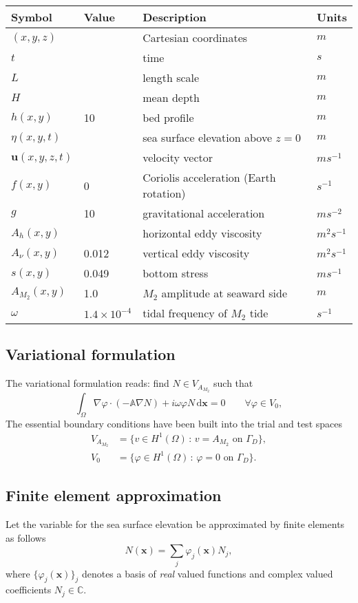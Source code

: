\documentclass[11pt,a4paper]{article}
\begin{document}
\begin{center}
\begin{tabular}{|l|l|l|l|}
\hline
Symbol & Value & Description & Units\\
\hline
$(x,y,z)$ & & Cartesian coordinates & $m$\\
$t$ & & time & $s$\\
$L$ & & length scale & $m$\\
$H$ & & mean depth & $m$\\
$h(x,y)$ & 10 & bed profile & $m$\\
$\eta(x,y,t)$ & & sea surface elevation above $z=0$ & $m$\\
$\mathbf{u}(x,y,z,t)$ & & velocity vector & $m s^{-1}$\\
$f(x,y)$ & 0 & Coriolis acceleration (Earth rotation) & $s^{-1}$\\
$g$ & 10 & gravitational acceleration & $ms^{-2}$\\
$A_h(x,y)$ & & horizontal eddy viscosity & $m^2 s^{-1}$\\
$A_\nu(x,y)$ & 0.012 & vertical eddy viscosity & $m^2 s^{-1}$\\
$s(x,y)$ & 0.049 & bottom stress & $m s^{-1}$\\
$A_{M_2}(x,y)$ & 1.0 & $M_2$ amplitude at seaward side & $m$\\
$\omega$ & $1.4\times 10^{-4}$ &tidal frequency of $M_2$ tide & $s^{-1}$\\
\hline
\end{tabular}
\end{center}

\subsection{Variational formulation}
The variational formulation reads: find $N\in V_{A_{M_2}}$ such that
\begin{equation}
\int_\Omega\nabla \varphi\cdot(-\mathbb{A}\nabla N)+ i\omega \varphi N\,\mathrm{d}\mathbf{x}=0\qquad \forall \varphi\in V_0,
\end{equation}
The essential boundary conditions have been built into the trial and test spaces
\begin{align}
V_{A_{M_2}}&=\{v\in H^1(\Omega)\,:\, v=A_{M_2}\text{ on }\Gamma_D\},\\
V_0&=\{\varphi\in H^1(\Omega)\,:\, \varphi=0\text{ on }\Gamma_D\}.
\end{align}

\subsection{Finite element approximation}
Let the variable for the sea surface elevation be approximated by finite elements as follows
\begin{equation}
N(\mathbf{x})=\sum_{j}\varphi_j(\mathbf{x})N_j,
\end{equation}
where $\{\varphi_j(\mathbf{x})\}_j$ denotes a basis of \emph{real} valued functions and complex valued coefficients $N_j\in\mathbb{C}$.
\end{document}
